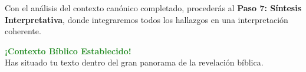 \documentclass[11pt,a4paper]{article}
\begin{document}
Con el análisis del contexto canónico completado, procederás al \textbf{Paso 7: Síntesis Interpretativa}, donde integraremos todos los hallazgos en una interpretación coherente.

\vspace{1cm}

\begin{center}
\begin{tcolorbox}[colback=mintgreen!20, colframe=mintgreen, width=0.7\textwidth]
\centering
\textcolor{forestgreen}{\textbf{¡Contexto Bíblico Establecido!}}\\
\textcolor{papergray}{Has situado tu texto dentro del gran panorama de la revelación bíblica.}
\end{tcolorbox}
\end{center}
\end{document}
